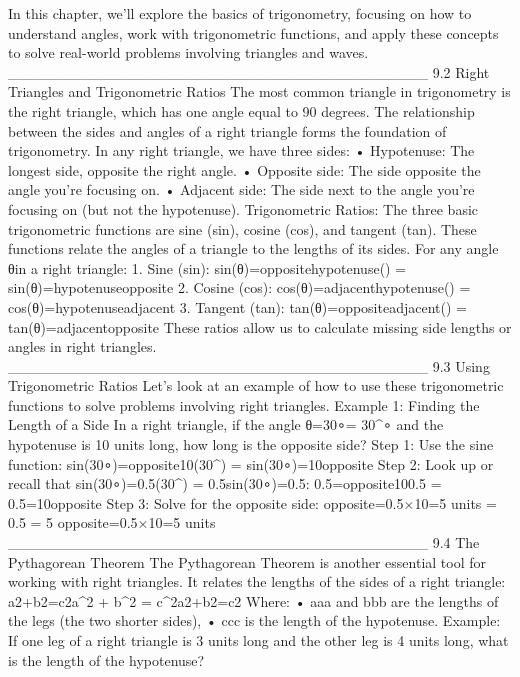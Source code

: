 In this chapter, we’ll explore the basics of trigonometry, focusing on how to understand angles, work with trigonometric functions, and apply these concepts to solve real-world problems involving triangles and waves.
________________________________________
9.2 Right Triangles and Trigonometric Ratios
The most common triangle in trigonometry is the right triangle, which has one angle equal to 90 degrees. The relationship between the sides and angles of a right triangle forms the foundation of trigonometry.
In any right triangle, we have three sides:
•	Hypotenuse: The longest side, opposite the right angle.
•	Opposite side: The side opposite the angle you’re focusing on.
•	Adjacent side: The side next to the angle you’re focusing on (but not the hypotenuse).
Trigonometric Ratios:
The three basic trigonometric functions are sine (sin), cosine (cos), and tangent (tan). These functions relate the angles of a triangle to the lengths of its sides.
For any angle θ in a right triangle:
1.	Sine (sin):
sin⁡(θ)=oppositehypotenuse\sin(\theta) = sin(θ)=hypotenuseopposite
2.	Cosine (cos):
cos⁡(θ)=adjacenthypotenuse\cos(\theta) = cos(θ)=hypotenuseadjacent
3.	Tangent (tan):
tan⁡(θ)=oppositeadjacent\tan(\theta) = tan(θ)=adjacentopposite
These ratios allow us to calculate missing side lengths or angles in right triangles.
________________________________________
9.3 Using Trigonometric Ratios
Let’s look at an example of how to use these trigonometric functions to solve problems involving right triangles.
Example 1: Finding the Length of a Side
In a right triangle, if the angle θ=30∘\theta = 30^∘ and the hypotenuse is 10 units long, how long is the opposite side?
Step 1: Use the sine function:
sin⁡(30∘)=opposite10\sin(30^\circ) = sin(30∘)=10opposite
Step 2: Look up or recall that sin⁡(30∘)=0.5\sin(30^\circ) = 0.5sin(30∘)=0.5:
0.5=opposite100.5 = 0.5=10opposite
Step 3: Solve for the opposite side:
opposite=0.5×10=5 units = 0.5  = 5 opposite=0.5×10=5 units
________________________________________
9.4 The Pythagorean Theorem
The Pythagorean Theorem is another essential tool for working with right triangles. It relates the lengths of the sides of a right triangle:
a2+b2=c2a^2 + b^2 = c^2a2+b2=c2
Where:
•	aaa and bbb are the lengths of the legs (the two shorter sides),
•	ccc is the length of the hypotenuse.
Example:
If one leg of a right triangle is 3 units long and the other leg is 4 units long, what is the length of the hypotenuse?
